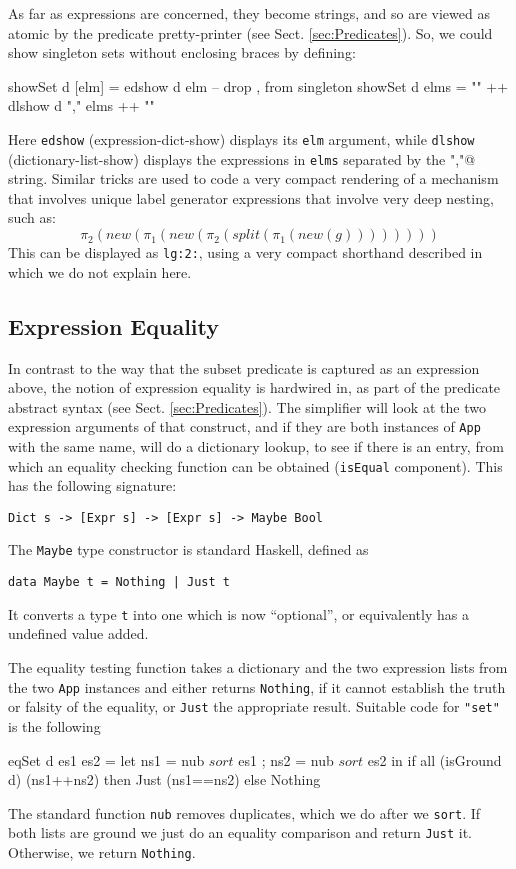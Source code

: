 As far as expressions are concerned,
they become strings, and so are viewed as atomic
by the predicate pretty-printer (see Sect. \ref{sec:Predicates}).
So, we could show singleton sets without enclosing braces
by defining:
\begin{code}
showSet d [elm] = edshow d elm   -- drop {,} from singleton
showSet d elms = "{" ++ dlshow d "," elms ++ "}"
\end{code}
Here \texttt{edshow} (expression-dict-show)
displays its \texttt{elm} argument,
while \texttt{dlshow} (dictionary-list-show) displays the expressions
in \texttt{elms} separated by the \verb@","@ string.
Similar tricks are used to code a very compact rendering
of a mechanism that involves unique label generator expressions
that involve very deep nesting, such as:
\[
 \pi_2(new(\pi_1(new(\pi_2(split(\pi_1(new(g))))))))
\]
This can be displayed as \texttt{lg:2:},
using a very compact shorthand described in \cite{conf/tase/BMN16}
which we do not explain here.


\subsection{Expression Equality}

In contrast to the way that the subset predicate
is captured as an expression above,
the notion of expression equality is hardwired in,
as part of the predicate abstract syntax (see Sect. \ref{sec:Predicates}).
The simplifier will look at the two expression
arguments of that construct,
and if they are both instances of \texttt{App} with the same name,
will do a dictionary lookup, to see if there
is an entry, from
which an equality checking function can be obtained (\texttt{isEqual} component).
This has the following signature:
\begin{verbatim}
Dict s -> [Expr s] -> [Expr s] -> Maybe Bool
\end{verbatim}
The \texttt{Maybe} type constructor is standard Haskell, defined as
\begin{verbatim}
data Maybe t = Nothing | Just t
\end{verbatim}
It converts a type \texttt{t} into one which is now ``optional'',
or equivalently has a undefined value added.

The equality testing function takes a dictionary and the two expression
lists from the two \texttt{App} instances
and either returns \texttt{Nothing},
if it cannot establish the truth or falsity of the equality,
or \texttt{Just} the appropriate result.
Suitable code for \verb$"set"$ is the following
\begin{code}
eqSet d es1 es2
 = let ns1 = nub $ sort $ es1 ; ns2 = nub $ sort $ es2
   in if all (isGround d) (ns1++ns2)
      then Just (ns1==ns2) else Nothing
\end{code}
The standard function \texttt{nub} removes duplicates,
which we do after we \texttt{sort}.
If both lists are ground we just do an equality comparison
and return \texttt{Just} it. Otherwise, we return \texttt{Nothing}.




